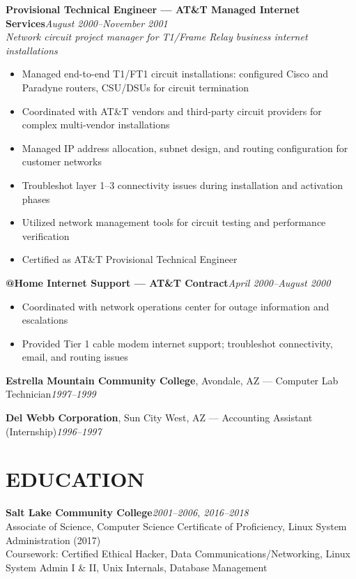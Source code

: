 \documentclass[9pt,letterpaper]{extarticle}
\begin{document}
\smallskip
{}
\textbf{Provisional Technical Engineer --- AT\&T Managed Internet Services}\hfill\textit{August 2000--November 2001}\\
\textit{Network circuit project manager for T1/Frame Relay business internet installations}
\begin{itemize}
  \item Managed end-to-end T1/FT1 circuit installations: configured Cisco and Paradyne routers, CSU/DSUs for circuit termination
  \item Coordinated with AT\&T vendors and third-party circuit providers for complex multi-vendor installations
  \item Managed IP address allocation, subnet design, and routing configuration for customer networks
  \item Troubleshot layer 1--3 connectivity issues during installation and activation phases
  \item Utilized network management tools for circuit testing and performance verification
  \item Certified as AT\&T Provisional Technical Engineer
\end{itemize}

\textbf{@Home Internet Support --- AT\&T Contract}\hfill\textit{April 2000--August 2000}
\begin{itemize}
  \item Coordinated with network operations center for outage information and escalations
  \item Provided Tier 1 cable modem internet support; troubleshot connectivity, email, and routing issues
\end{itemize}

\vspace{3pt}
\noindent\textbf{Estrella Mountain Community College}, Avondale, AZ --- Computer Lab Technician\hfill\textit{1997--1999}

\vspace{3pt}
\noindent\textbf{Del Webb Corporation}, Sun City West, AZ --- Accounting Assistant (Internship)\hfill\textit{1996--1997}

\section*{EDUCATION}

\noindent\textbf{Salt Lake Community College}\hfill\textit{2001--2006, 2016--2018}\\
Associate of Science, Computer Science \textbullet{} Certificate of Proficiency, Linux System Administration (2017)\\
Coursework: Certified Ethical Hacker, Data Communications/Networking, Linux System Admin I \& II, Unix Internals, Database Management
\end{document}

